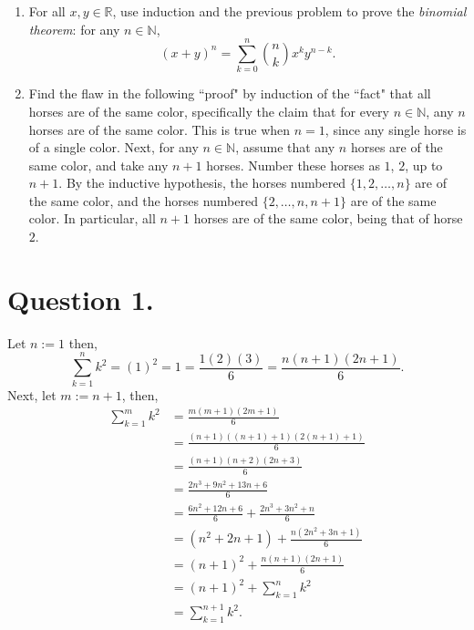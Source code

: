 \documentclass[12 pt,letterpaper]{article}
\newcommand{\bbN}{\mathbb{N}}
\newcommand{\bbR}{\mathbb{R}}
\newcommand{\set}[1]{\{{#1}\}}
\begin{document}
\begin{enumerate}
\item
For all $x,y\in\bbR$,
use induction and the previous problem to prove the \textit{binomial theorem}:
for any $n\in\bbN$,
\begin{equation*}
(x+y)^n=\sum_{k=0}^{n}\binom{n}{k}x^ky^{n-k}.
\end{equation*}

\item
Find the flaw in the following ``proof" by induction of the ``fact" that all horses are of the same color,
specifically the claim that for every $n\in\bbN$,
any $n$ horses are of the same color.
This is true when $n=1$, since any single horse is of a single color.
Next, for any $n\in\bbN$,
assume that any $n$ horses are of the same color,
and take any $n+1$ horses.
Number these horses as $1$, $2$, up to $n+1$.
By the inductive hypothesis, the horses numbered $\set{1,2,\dotsc,n}$ are of the same color, and the horses numbered $\set{2,\dotsc,n,n+1}$ are of the same color.
In particular, all $n+1$ horses are of the same color,
being that of horse $2$.
\end{enumerate}

\clearpage
\section*{Question 1.}
Let \(n:=1\) then,
\[\sum_{k=1}^{n} k^2 = (1)^2 = 1 = \frac{1(2)(3)}{6} = \frac{n(n+1)(2n+1)}{6}.\]
Next, let \(m:=n+1\), then,
\begin{align*}
    \sum_{k=1}^{m} k^2
    &= \frac{m(m+1)(2m+1)}{6} \\
    &= \frac{(n+1)((n+1)+1)(2(n+1)+1)}{6} \\
    &= \frac{(n+1)(n+2)(2n+3)}{6} \\
    &= \frac{2n^3+9n^2+13n+6}{6} \\
    &= \frac{6n^2+12n+6}{6} + \frac{2n^3+3n^2+n}{6} \\
    &= (n^2+2n+1) + \frac{n(2n^2+3n+1)}{6} \\
    &= (n+1)^2 + \frac{n(n+1)(2n+1)}{6} \\
    &= (n+1)^2 + \sum_{k=1}^{n} k^2 \\
    &= \sum_{k=1}^{n+1} k^2.
\end{align*}

\clearpage
\end{document}
